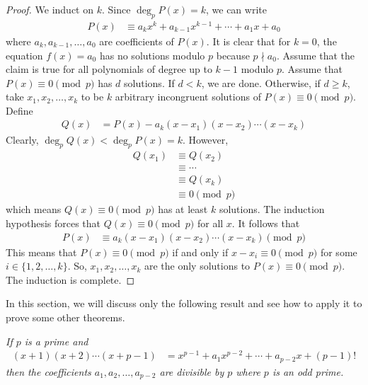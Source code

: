 \documentclass[12pt]{subfile}
\begin{document}
		\begin{proof}
			We induct on $k$. Since $\deg_p P(x) = k$, we can write
				\begin{align*}
					P(x)
						& \equiv a_kx^k + a_{k-1}x^{k-1} + \cdots + a_1 x +a_0
				\end{align*}
			where $a_k, a_{k-1}, \ldots, a_0$ are coefficients of $P(x)$. It is clear that for $k=0$, the equation $f(x)=a_0$ has no solutions modulo $p$ because $p \nmid a_0$. Assume that the claim is true for all polynomials of degree up to $k-1$ modulo $p$. Assume that $P(x) \equiv 0 \pmod p$ has $d$ solutions. If $d < k$, we are done. Otherwise, if $d\geq k$, take $x_1, x_2, \ldots, x_k$ to be $k$ arbitrary incongruent solutions of $P(x) \equiv 0 \pmod p$. Define
				\begin{align*}
					Q(x)
						& = P(x) - a_k(x-x_1)(x-x_2)\cdots (x-x_k)
				\end{align*}
			Clearly, $\deg_p Q(x) < \deg_p P(x)=k$. However,
				\begin{align*}
					Q(x_1)
						& \equiv Q(x_2)\\
						& \equiv \cdots \\
						& \equiv Q(x_k)\\
						& \equiv 0 \pmod p
				\end{align*}
			which means $Q(x) \equiv 0 \pmod p$ has at least $k$ solutions. The induction hypothesis forces that $Q(x) \equiv 0 \pmod p$ for all $x$. It follows that
				\begin{align*}
					P(x)
						& \equiv a_k(x-x_1)(x-x_2)\cdots (x-x_k) \pmod p
				\end{align*}
			This means that $P(x) \equiv 0 \pmod p$ if and only if $x-x_i \equiv 0 \pmod p$ for some $i \in \{1,2,\ldots, k\}$. So, $x_1, x_2, \ldots, x_k$ are the only solutions to $P(x) \equiv 0 \pmod p$. The induction is complete.
		\end{proof}


	In this section, we will discuss only the following result and see how to apply it to prove some other theorems.
		\begin{theorem}[Lagrange]\slshape
			If $p$ is a prime and\label{thm:lag2}
				\begin{align}\label{eq:lagrangeproof0}
					(x+1)(x+2)\cdots(x+p-1) & = x^{p-1}+a_1x^{p-2}+\cdots+a_{p-2}x+(p-1)!
				\end{align}
			then the coefficients $a_1,a_2, \ldots,a_{p-2}$ are divisible by $p$ where $p$ is an odd prime.
		\end{theorem}
\end{document}
